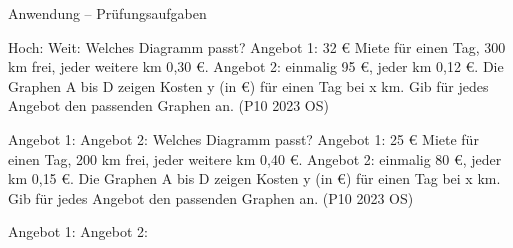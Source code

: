 \begin{aufgabe}{Anwendung – Prüfungsaufgaben}
\begin{teile}
\begin{ksys}[xmin=0,xmax=12,ymin=0,ymax=100,xstep=1,ystep=10,xlabel=x in Monaten,ylabel=y in €,ablesen]   \end{ksys}
Hoch: \leerfeld \quad Weit: \leerfeld
\teil Welches Diagramm passt? Angebot 1: 32 € Miete für einen Tag, 300 km frei, jeder weitere km 0{,}30 €. Angebot 2: einmalig 95 €, jeder km 0{,}12 €. Die Graphen A bis D zeigen Kosten y (in €) für einen Tag bei x km. Gib für jedes Angebot den passenden Graphen an. \hfill (P10 2023 OS) \\

\begin{ksys}[xmin=0,xmax=600,ymin=0,ymax=200,xstep=100,ystep=20,xlabel=x in km,ylabel=y in €,ablesen]     \end{ksys}
Angebot 1: \leerfeld \quad Angebot 2: \leerfeld
\teil Welches Diagramm passt? Angebot 1: 25 € Miete für einen Tag, 200 km frei, jeder weitere km 0{,}40 €. Angebot 2: einmalig 80 €, jeder km 0{,}15 €. Die Graphen A bis D zeigen Kosten y (in €) für einen Tag bei x km. Gib für jedes Angebot den passenden Graphen an. \hfill (P10 2023 OS) \\

\begin{ksys}[xmin=0,xmax=500,ymin=0,ymax=160,xstep=100,ystep=20,xlabel=x in km,ylabel=y in €,ablesen]     \end{ksys}
Angebot 1: \leerfeld \quad Angebot 2: \leerfeld
\end{teile}
\end{aufgabe}

